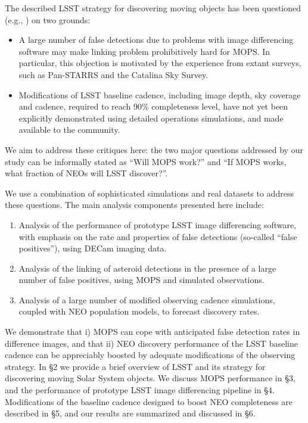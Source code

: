 The described LSST strategy for discovering moving objects has been questioned (e.g., \citealt{GMS2016}) on 
two grounds:
\begin{itemize}
\item A large number of false detections due to problems with image differencing software may 
make linking problem prohibitively hard for MOPS. In particular, this objection is motivated by the experience
from extant surveys, such as Pan-STARRS and the Catalina Sky Survey. 
\item Modifications of LSST baseline cadence, including image depth, sky coverage and cadence,
required to reach 90\% completeness level, have not yet been explicitly demonstrated using detailed
operations simulations, and made available to the community. 
\end{itemize} 
We aim to address these critiques here: the two major questions addressed by our study can be informally 
stated as ``Will MOPS work?'' and ``If MOPS works, what fraction of  NEOs will LSST discover?''. 

We use a combination of sophisticated simulations and real datasets to address these questions.
The main analysis components presented here include: 
\begin{enumerate}
\item Analysis of the performance of prototype LSST image differencing software, with emphasis on the rate and 
    properties of false detections (so-called ``false positives''), using DECam imaging data. 
\item Analysis of the linking of asteroid detections in the presence of a large number of false positives, using MOPS
         and simulated observations. 
\item Analysis of a large number of modified observing cadence simulations, coupled with NEO population
          models, to forecast discovery rates. 
\end{enumerate} 

We demonstrate that i) MOPS can cope with anticipated false detection rates 
in difference images, and that ii) NEO discovery performance of the LSST baseline cadence
can be appreciably boosted by adequate modifications of the observing strategy. 
In \S2 we provide a brief overview of LSST and its strategy for discovering moving Solar 
System objects. 
We discuss MOPS performance in \S3, and the performance of prototype LSST image 
differencing pipeline in \S4. Modifications of the baseline cadence designed to 
boost NEO completeness are described in \S5, and our results are summarized and
discussed in \S6. 

